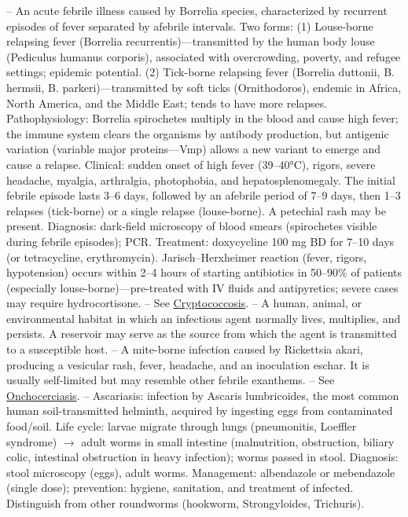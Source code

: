 -- An acute febrile illness caused by Borrelia species, characterized by recurrent episodes of fever separated by afebrile intervals. Two forms: (1) Louse-borne relapsing fever (Borrelia recurrentis)—transmitted by the human body louse (Pediculus humanus corporis), associated with overcrowding, poverty, and refugee settings; epidemic potential. (2) Tick-borne relapsing fever (Borrelia duttonii, B. hermsii, B. parkeri)—transmitted by soft ticks (Ornithodoros), endemic in Africa, North America, and the Middle East; tends to have more relapses. Pathophysiology: Borrelia spirochetes multiply in the blood and cause high fever; the immune system clears the organisms by antibody production, but antigenic variation (variable major proteins—Vmp) allows a new variant to emerge and cause a relapse. Clinical: sudden onset of high fever (39--40°C), rigors, severe headache, myalgia, arthralgia, photophobia, and hepatosplenomegaly. The initial febrile episode lasts 3--6 days, followed by an afebrile period of 7--9 days, then 1--3 relapses (tick-borne) or a single relapse (louse-borne). A petechial rash may be present. Diagnosis: dark-field microscopy of blood smears (spirochetes visible during febrile episodes); PCR. Treatment: doxycycline 100 mg BD for 7--10 days (or tetracycline, erythromycin). Jarisch–Herxheimer reaction (fever, rigors, hypotension) occurs within 2--4 hours of starting antibiotics in 50--90\% of patients (especially louse-borne)—pre-treated with IV fluids and antipyretics; severe cases may require hydrocortisone.
-- See \hyperlink{Cryptococcosis}{Cryptococcosis}.
-- A human, animal, or environmental habitat in which an infectious agent normally lives, multiplies, and persists. A reservoir may serve as the source from which the agent is transmitted to a susceptible host.
-- A mite-borne infection caused by Rickettsia akari, producing a vesicular rash, fever, headache, and an inoculation eschar. It is usually self-limited but may resemble other febrile exanthems.
-- See \hyperlink{Onchocerciasis}{Onchocerciasis}.
-- Ascariasis: infection by Ascaris lumbricoides, the most common human soil-transmitted helminth, acquired by ingesting eggs from contaminated food/soil. Life cycle: larvae migrate through lungs (pneumonitis, Loeffler syndrome) $\rightarrow$ adult worms in small intestine (malnutrition, obstruction, biliary colic, intestinal obstruction in heavy infection); worms passed in stool. Diagnosis: stool microscopy (eggs), adult worms. Management: albendazole or mebendazole (single dose); prevention: hygiene, sanitation, and treatment of infected. Distinguish from other roundworms (hookworm, Strongyloides, Trichuris).
